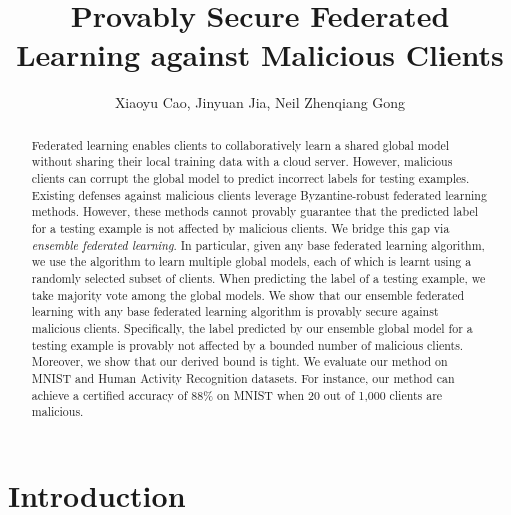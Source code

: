 \documentclass[letterpaper]{article} %
\title{Provably Secure Federated Learning against Malicious Clients}
\author{
       Xiaoyu Cao,
       Jinyuan Jia,
       Neil Zhenqiang Gong \\
}
\begin{document}

\maketitle



\begin{abstract}
Federated learning enables clients to collaboratively learn a shared global model without sharing their local training data with a cloud server. However, malicious clients can corrupt the global model to predict incorrect labels for testing examples. Existing defenses against malicious clients leverage Byzantine-robust federated learning methods. However, these methods cannot provably guarantee that the predicted label for a testing example is  not affected by malicious clients.  We bridge this gap via \emph{ensemble federated learning}.  In particular, given any base federated learning algorithm, we use the algorithm to learn multiple global models, each of which is learnt using a randomly selected subset of clients. When predicting the label of a testing example, we take majority vote among the  global models. We show that our ensemble federated learning with any base federated learning algorithm is provably secure against malicious clients. Specifically, the label predicted by our ensemble global model for a testing example is provably not affected by a bounded number of malicious clients. Moreover, we show that our derived bound is tight. We evaluate our method on MNIST and Human Activity Recognition datasets. For instance, our method can achieve a certified accuracy of 88\% on MNIST when 20 out of 1,000 clients are malicious.
\end{abstract}


\section{Introduction}
\end{document}
